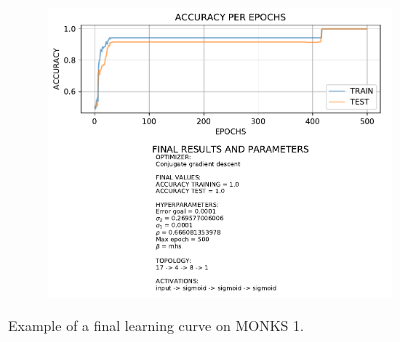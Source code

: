 \begin{appendices}
\begin{figure}[H]
\begin{subfigure}{0.60\textwidth}
{                            \includegraphics{img/CGD/MHS/cgd_accuracy_test_mhs_monks_1.pdf}
                        }
                        \caption{}
                        \label{fig:monks_1_ACC_CGD_MHS}
                    \end{subfigure}
                    \caption{Example of a final learning curve on MONKS 1.}
                    \label{fig:monks_1_CGD_MHS}
                \end{figure}


\end{appendices}
